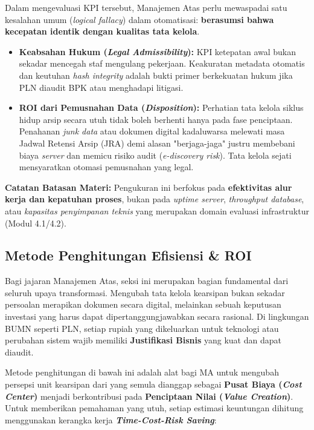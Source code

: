 \documentclass[12pt,a4paper]{report}
\begin{document}
\begin{plnbox}
\small
Dalam mengevaluasi KPI tersebut, Manajemen Atas perlu mewaspadai satu kesalahan umum (\textit{logical fallacy}) dalam otomatisasi: \textbf{berasumsi bahwa kecepatan identik dengan kualitas tata kelola}. 

\begin{itemize}[leftmargin=*]
    \item \textbf{Keabsahan Hukum (\textit{Legal Admissibility}):} KPI ketepatan awal bukan sekadar mencegah staf mengulang pekerjaan. Keakuratan metadata otomatis dan keutuhan \textit{hash integrity} adalah bukti primer berkekuatan hukum jika PLN diaudit BPK atau menghadapi litigasi.
    \item \textbf{ROI dari Pemusnahan Data (\textit{Disposition}):} Perhatian tata kelola siklus hidup arsip secara utuh tidak boleh berhenti hanya pada fase penciptaan. Penahanan \textit{junk data} atau dokumen digital kadaluwarsa melewati masa Jadwal Retensi Arsip (JRA) demi alasan "berjaga-jaga" justru membebani biaya \textit{server} dan memicu risiko audit (\textit{e-discovery risk}). Tata kelola sejati mensyaratkan otomasi pemusnahan yang legal.
\end{itemize}
\end{plnbox}

\begin{warnbox}
\textbf{Catatan Batasan Materi:} Pengukuran ini berfokus pada \textbf{efektivitas alur kerja dan kepatuhan proses}, bukan pada \textit{uptime server}, \textit{throughput database}, atau \textit{kapasitas penyimpanan teknis} yang merupakan domain evaluasi infrastruktur (Modul 4.1/4.2).
\end{warnbox}

\subsection{Metode Penghitungan Efisiensi \& ROI}
Bagi jajaran Manajemen Atas, seksi ini merupakan bagian fundamental dari seluruh upaya transformasi. Mengubah tata kelola kearsipan bukan sekadar persoalan merapikan dokumen secara digital, melainkan sebuah keputusan investasi yang harus dapat dipertanggungjawabkan secara rasional. Di lingkungan BUMN seperti PLN, setiap rupiah yang dikeluarkan untuk teknologi atau perubahan sistem wajib memiliki \textbf{Justifikasi Bisnis} yang kuat dan dapat diaudit.

Metode penghitungan di bawah ini adalah alat bagi MA untuk mengubah persepsi unit kearsipan dari yang semula dianggap sebagai \textbf{Pusat Biaya (\textit{Cost Center})} menjadi berkontribusi pada \textbf{Penciptaan Nilai (\textit{Value Creation})}. Untuk memberikan pemahaman yang utuh, setiap estimasi keuntungan dihitung menggunakan kerangka kerja \textbf{\textit{Time-Cost-Risk Saving}}:
\end{document}
